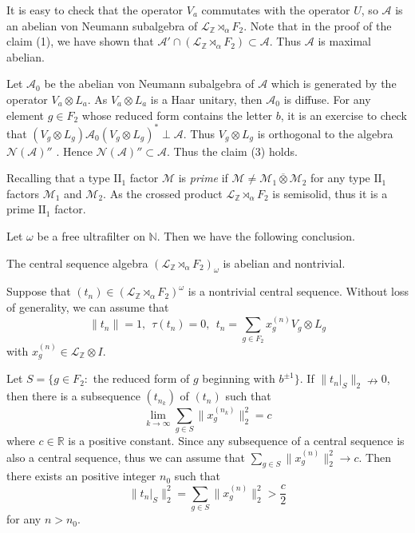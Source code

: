 \documentclass[12pt]{article}
\begin{document}
It is easy to check that the operator $V_{a}$ commutates with the
operator $U$, so $\mathcal{A}$ is an abelian von Neumann subalgebra
of $\mathcal{L}_{\mathbb{Z}}\rtimes_{\alpha}F_{2}$. Note that in the
proof of the claim (1), we have shown that
$\mathcal{A}'\cap(\mathcal{L}_{\mathbb{Z}}\rtimes_{\alpha}F_{2})\subset\mathcal{A}$.
Thus $\mathcal{A}$ is maximal abelian.

Let $\mathcal{A}_{0}$ be the abelian von Neumann subalgebra of
$\mathcal{A}$ which is generated by the operator $V_{a}\otimes
L_{a}$. As $V_{a}\otimes L_{a}$ is a Haar unitary, then
$\mathcal{A}_{0}$ is diffuse. For any element $g\in F_{2}$ whose
reduced form contains the letter $b$, it is an exercise to check
that $(V_{g}\otimes L_{g})\mathcal{A}_{0}(V_{g}\otimes
L_{g})^{*}\perp\mathcal{A}$. Thus $V_{g}\otimes L_{g}$ is orthogonal
to the algebra $\mathcal{N}(\mathcal{A})''$ {\cite{[Po]}}. Hence
$\mathcal{N}(\mathcal{A})''\subset\mathcal{A}$. Thus the claim (3)
holds.
\endproof

\vskip6pt

 Recalling that a type $\mathrm{II}_{1}$
factor $\mathcal{M}$ is {\it prime} if
$\mathcal{M}\neq\mathcal{M}_{1}\overline{\otimes}\mathcal{M}_{2}$
for any type $\mathrm{II}_{1}$ factors $\mathcal{M}_{1}$ and
$\mathcal{M}_{2}$. As the crossed product
$\mathcal{L}_{\mathbb{Z}}\rtimes_{\alpha}F_{2}$ is semisolid, thus
it is a prime $\mathrm{II}_{1}$ factor.

Let $\omega$ be a free ultrafilter on $\mathbb{N}$. Then we have the
following conclusion. \vskip6pt



  The central sequence algebra
$(\mathcal{L}_{\mathbb{Z}}\rtimes_{\alpha}F_{2})_{\omega}$ is
abelian and nontrivial. \vskip6pt

 Suppose that
$(t_{n})\in(\mathcal{L}_{\mathbb{Z}}\rtimes_{\alpha}F_{2})^{\omega}$
is a nontrivial central sequence. Without loss of generality, we can
assume that
$$\|t_{n}\|=1, \  \ \tau(t_{n})=0, \  \ t_{n}=\sum_{g\in
F_{2}}x_{g}^{(n)}V_{g}\otimes L_{g}$$ with
$x_{g}^{(n)}\in\mathcal{L}_{\mathbb{Z}}\otimes I$.

Let $S=\{g\in F_{2}:$ the reduced form of $g$ beginning with $b^{\pm
1}\}$. If $\|t_{n}|_{S}\|_{2}\nrightarrow0$, then there is a
subsequence $(t_{n_{k}})$ of $(t_{n})$ such that
$$\lim_{k\rightarrow\infty}\sum_{g\in S}\|x_{g}^{(n_{k})}\|_{2}^{2}=c$$
where $c\in\mathbb{R}$ is a positive constant. Since any subsequence
of a central sequence is also a central sequence, thus we can assume
that
 $\sum_{g\in S}\|x_{g}^{(n)}\|_{2}^{2}\rightarrow c.$
Then there exists an positive integer $n_{0}$ such that
$$\|t_{n}|_{S}\|_{2}^{2}=\sum_{g\in
S}\|x_{g}^{(n)}\|_{2}^{2}>\frac{c}{2}$$
for any $n>n_{0}$.
\end{document}
